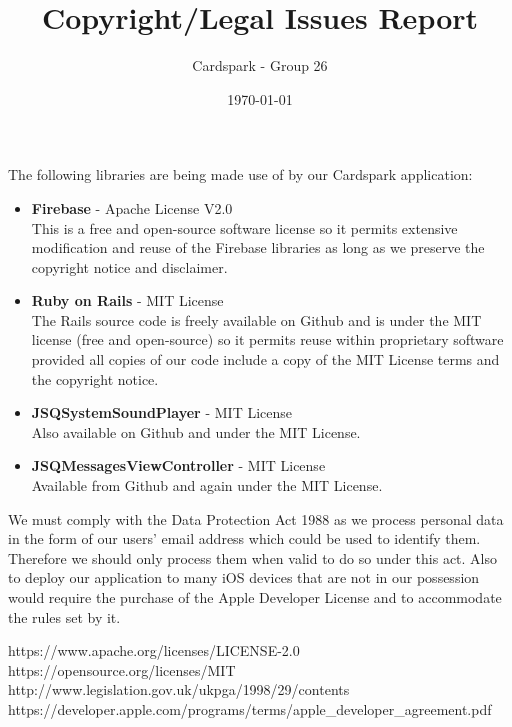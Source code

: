 \documentclass[a4wide, 10pt]{article}
\begin{document}
\title{Copyright/Legal Issues Report}

\author{Cardspark - Group 26}

\date{\today}         %

\maketitle            %

The following libraries are being made use of by our Cardspark application:
\begin{itemize}
	\item \textbf{Firebase} - Apache License V2.0 \cite{Apache License V2.0}\\
	This is a free and open-source software license so it permits extensive 		modification and reuse of the Firebase libraries as long as we preserve 		the 	copyright notice and disclaimer.
	
	\item \textbf{Ruby on Rails} - MIT License \cite{MIT License}\\
	The Rails source code is freely available on Github and is under the MIT 		license (free and open-source) so it permits reuse within proprietary 		software provided all copies of our code include a copy of the MIT 			License terms and the copyright notice.
	
	\item \textbf{JSQSystemSoundPlayer} - MIT License\\
	Also available on Github and under the MIT License.
	
	\item \textbf{JSQMessagesViewController} - MIT License\\
	Available from Github and again under the MIT License.

\end{itemize}

\vspace{0.8cm}

We must comply with the Data Protection Act 1988 \cite{Data Protection Act} as we process personal data in the form of our users' email address which could be used to identify them.  Therefore we should only process them when valid to do so under this act.  Also to deploy our application to many iOS devices that are not in our possession would require the purchase of the Apple Developer License \cite{Apple Developer Agreement} and to accommodate the rules set by it.

\begin{thebibliography}{1}
		https://www.apache.org/licenses/LICENSE-2.0
		https://opensource.org/licenses/MIT
		http://www.legislation.gov.uk/ukpga/1998/29/contents
		https://developer.apple.com/programs/terms/apple\_developer\_agreement.pdf
\end{thebibliography}
\end{document}
